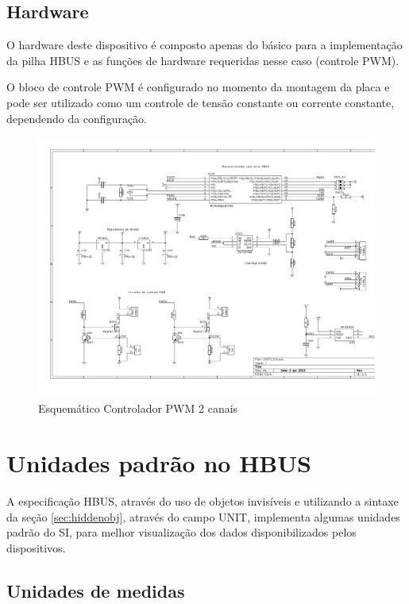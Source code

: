 \documentclass[11pt]{report}
\begin{document}
\section{Hardware}

O hardware deste dispositivo é composto apenas do básico para a implementação da pilha HBUS e as funções de hardware requeridas nesse caso (controle PWM).

O bloco de controle PWM é configurado no momento da montagem da placa e pode ser utilizado como um controle de tensão constante ou corrente constante, dependendo da configuração.


\begin{figure}[H]
\centering
\includegraphics[scale=0.75]{../media/LEDCTL2CH}
\caption{Esquemático Controlador PWM 2 canais}
\end{figure}

\appendix
\chapter{Unidades padrão no HBUS}

A especificação HBUS, através do uso de objetos invisíveis e utilizando a sintaxe da seção \ref{sec:hiddenobj}, através do campo UNIT, implementa algumas unidades padrão do SI, para melhor visualização dos dados disponibilizados pelos dispositivos.

\section{Unidades de medidas}
\end{document}
